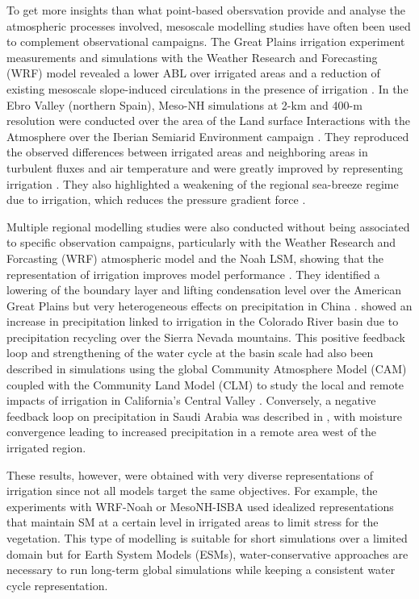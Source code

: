 To get more insights than what point-based obersvation provide and analyse the atmospheric processes involved, mesoscale modelling studies have often been used to complement observational campaigns. 
The Great Plains irrigation experiment \cite[GRAINEX,][]{rappin_great_2021} measurements and simulations with the Weather Research and Forecasting (WRF) model revealed a lower ABL over irrigated areas and a reduction of existing mesoscale slope-induced circulations in the presence of irrigation \citep{rappin_landatmosphere_2022, phillips_influence_2022}. 
In the Ebro Valley (northern Spain), Meso-NH simulations at 2-km and 400-m resolution were conducted over the area of the Land surface Interactions with the Atmosphere over the Iberian Semiarid Environment campaign \citep[LIAISE][]{boone_land_2019}. They reproduced the observed differences between irrigated areas and neighboring areas in turbulent fluxes and air temperature and were greatly improved by representing irrigation \citep{lunel_irrigation_2024}. They also highlighted a weakening of the regional sea-breeze regime due to irrigation, which reduces the pressure gradient force \citep{lunel_marinada_2024}.  

Multiple regional modelling studies were also conducted without being associated to specific observation campaigns, particularly with the Weather Research and Forcasting (WRF) atmospheric model and the Noah LSM, showing that the representation of irrigation improves model performance \citep{qian_modeling_2013, yang_impact_2017, liu_simulating_2021}. They identified a lowering of the boundary layer and lifting condensation level over the American Great Plains \citep{qian_modeling_2013} but very heterogeneous effects on precipitation in China \citep{liu_simulating_2021}. \citet{yang_impact_2017} showed an increase in precipitation linked to irrigation in the Colorado River basin due to precipitation recycling over the Sierra Nevada mountains. This positive feedback loop and strengthening of the water cycle at the basin scale had also been described in simulations using the global Community Atmosphere Model (CAM) coupled with the Community Land Model (CLM) to study the local and remote impacts of irrigation in California's Central Valley \citep{lo_irrigation_2013}. Conversely, a negative feedback loop on precipitation in Saudi Arabia was described in \citep{lo_intense_2021}, with moisture convergence leading to increased precipitation in a remote area west of the irrigated region.

These results, however, were obtained with very diverse representations of irrigation since not all models target the same objectives. For example, the experiments with WRF-Noah or MesoNH-ISBA \citep{lunel_irrigation_2024} used idealized representations that maintain SM at a certain level in irrigated areas to limit stress for the vegetation. This type of modelling is suitable for short simulations over a limited domain but for Earth System Models (ESMs), water-conservative approaches are necessary to run long-term global simulations while keeping a consistent water cycle representation.

